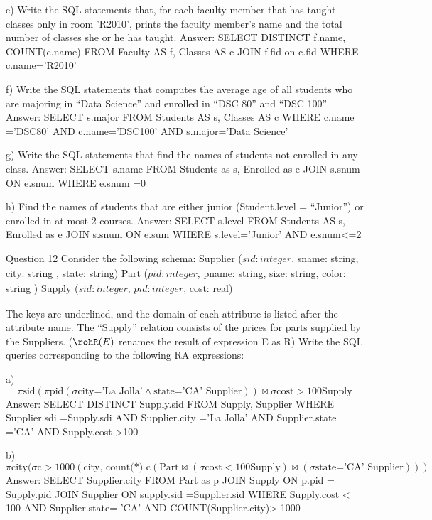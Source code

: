   e) Write the SQL statements that, for each faculty member that has taught classes only in room 'R2010', prints the faculty member’s name and the total number of classes she or he has taught.
    Answer:
    SELECT DISTINCT f.name, COUNT(c.name)
    FROM Faculty AS f, Classes AS c
    JOIN f.fid on c.fid
    WHERE c.name='R2010'

  f) Write the SQL statements that computes the average age of all students who are majoring in “Data Science” and enrolled in “DSC 80” and  “DSC 100”
    Answer:
    SELECT s.major
    FROM Students AS s, Classes AS c
    WHERE c.name ='DSC80' AND c.name='DSC100' AND s.major='Data Science'

  g) Write the SQL statements that find the names of students not enrolled in any class.
    Answer:
    SELECT s.name
    FROM Students as s, Enrolled as e
    JOIN s.snum ON e.snum
    WHERE e.snum =0

  h) Find the names of students that are either junior (Student.level = “Junior”) or enrolled in at most 2 courses. 
    Answer:
    SELECT s.level
    FROM Students AS s, Enrolled as e
    JOIN s.snum ON e.sum
    WHERE s.level='Junior' AND e.snum<=2

  Question 12
  Consider the following schema:
    Supplier ($\underline{sid: integer}$, sname: string, city: string ,  state: string)
    Part     ($\underline{pid: integer}$, pname: string, size: string, color: string )
    Supply   ($\underline{sid: integer}$,  $\underline{pid: integer}$, cost: real)

  The keys are underlined, and the domain of each attribute is listed after the attribute name. The “Supply” relation consists of the prices for parts supplied by the Suppliers. ($\rohR(E)$ renames the result of expression E as R)
  Write the SQL queries corresponding to the following RA expressions: 

  a) $$\pi \text{sid}(\pi \text{pid}(\sigma \text{city='La Jolla'} \wedge \text{state='CA' Supplier})) \bowtie \sigma \text{cost} > 100 \text{Supply}$$
    Answer:
    SELECT DISTINCT Supply.sid
    FROM Supply, Supplier
    WHERE Supplier.sdi =Supply.sdi
    AND Supplier.city ='La Jolla'
    AND Supplier.state ='CA'
    AND Supply.cost >100

  b) $$\pi \text{city}(\sigma \text{c} >1000(\text{city, count(*) c} (\text{Part} \bowtie (\sigma \text{cost}<100 \text{Supply}) \bowtie (\sigma \text{state='CA' Supplier})))$$
    Answer:
    SELECT Supplier.city
    FROM Part as p
    JOIN Supply ON p.pid = Supply.pid
    JOIN Supplier ON supply.sid =Supplier.sid
    WHERE Supply.cost < 100
    AND Supplier.state= 'CA'
    AND COUNT(Supplier.city)> 1000

